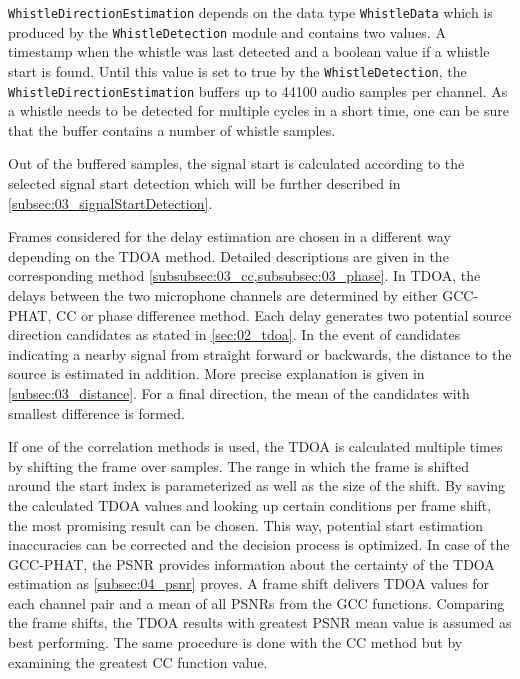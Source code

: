 \lstinline!WhistleDirectionEstimation! depends on the data type \lstinline!WhistleData!
which is produced by the \lstinline!WhistleDetection! module and contains two values.
A timestamp when the whistle was last detected
and a boolean value if a whistle start is found.
Until this value is set to true by the \lstinline!WhistleDetection!, the
\lstinline!WhistleDirectionEstimation! buffers up to
44100 audio samples per channel.
As a whistle needs to be detected for multiple cycles in a short time, one can
be sure that the buffer contains a number of whistle samples.

Out of the buffered samples, the signal start is calculated
according to the selected signal start detection
which will be further described in \cref{subsec:03_signalStartDetection}.

Frames considered for the delay estimation
are chosen in a different way depending on the \ac{TDOA} method.
Detailed descriptions are given in the corresponding method
\cref{subsubsec:03_cc,subsubsec:03_phase}.
In \ac{TDOA}, the delays between the two microphone channels are
determined by either \ac{GCC-PHAT}, \ac{CC} or phase difference method. 
Each delay generates two potential source direction candidates as stated
in \cref{sec:02_tdoa}.
In the event of candidates indicating a nearby signal from straight forward or
backwards, the distance to the source is estimated in addition.
More precise explanation is given in \cref{subsec:03_distance}.
For a final direction, the mean of the candidates with smallest difference
is formed. 

If one of the correlation methods is used, the \ac{TDOA} is calculated
multiple times by shifting the frame over samples.
The range in which the frame is shifted around the start index is parameterized
as well as the size of the shift. 
By saving the calculated \ac{TDOA} values and looking up  certain conditions per frame shift,
the most promising  result can be chosen.
This way, potential start estimation inaccuracies can be corrected and
the decision process is optimized.
In case of the \ac{GCC-PHAT}, the \ac{PSNR} provides information about
the certainty of the \ac{TDOA} estimation as \cref{subsec:04_psnr} proves.
A frame shift delivers \ac{TDOA} values for each channel pair and a
mean of all \acp{PSNR} from the \ac{GCC} functions.
Comparing the frame shifts, the \ac{TDOA} results with
greatest \ac{PSNR} mean value is assumed as best performing.
The same procedure is done with the \ac{CC} method but by examining
the greatest \ac{CC} function value.

